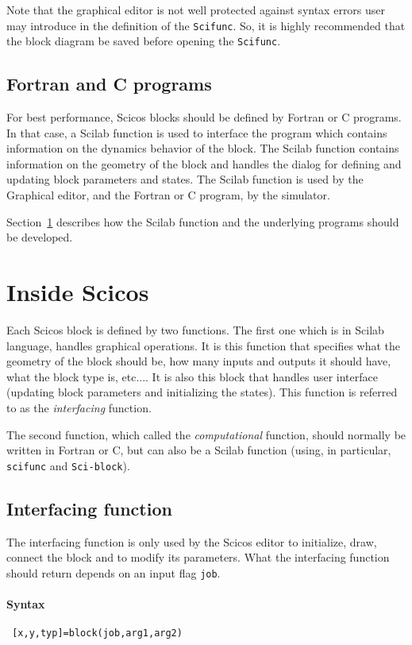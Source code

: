 Note that the graphical editor is not well protected against syntax
errors user may introduce in the definition of the {\tt Scifunc}. So,
it is highly recommended that the block diagram be saved before
opening the {\tt Scifunc}. 





\subsection{Fortran and C programs}
For best performance, Scicos   blocks should be defined by Fortran or C
programs. In that case, a Scilab function is used to interface the
program which contains information on the dynamics behavior of the
block. The Scilab function contains information on the geometry of the
block and handles the dialog for defining and updating block
parameters and states. The Scilab function is used by the Graphical
editor, and the Fortran or C program, by the simulator.

Section~\ref{vva} describes how the Scilab function and the underlying
programs should be developed.

\section{Inside Scicos  }
\label{vva}
Each Scicos  block is defined by two functions. The first one which
is in Scilab language, handles graphical operations. It is this
function that specifies what the geometry of the block should be, how
many inputs and outputs it should have, what the block type is,
etc.... It is also this block that handles user interface (updating
block parameters and initializing the states). This function is
referred to as the {\em interfacing} function.

The second function, which called the {\em computational} function,
should normally be written in Fortran or C, but can also be a
Scilab function (using, in particular, {\tt scifunc} and {\tt Sci-block}).

\subsection{Interfacing function}
The interfacing function is only used by the
Scicos   editor to initialize, draw, connect the block and to modify
its parameters. What the interfacing function should return depends on
an input flag {\tt job}.
\paragraph{Syntax}
\begin{verbatim}
 [x,y,typ]=block(job,arg1,arg2)
\end{verbatim}
